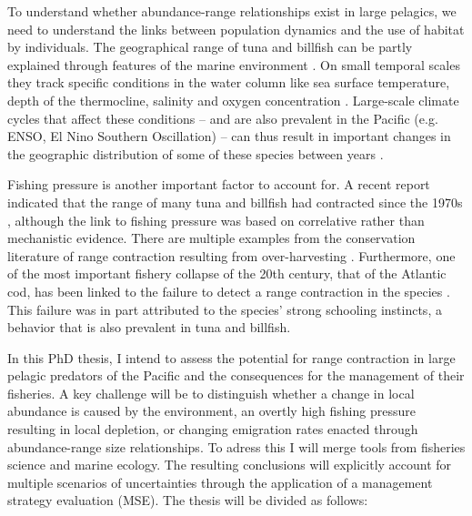 \documentclass{article}
\begin{document}
To understand whether abundance-range relationships exist in large
pelagics, we need to understand the links between population dynamics
and the use of habitat by individuals. The geographical range
of tuna and billfish can be partly explained through features of the
marine environment \citep[e.g.][]{Reygondeau2012_a}. On small temporal
scales they track specific conditions in the water column like sea surface
temperature, depth of the thermocline, salinity and oxygen
concentration \citep[e.g.][]{Fiedler1987_a, Reese2011_a}. Large-scale
climate cycles that affect these conditions -- and are also prevalent in
the Pacific (e.g. ENSO, El Nino Southern Oscillation) -- can thus result
in important changes in the geographic distribution of some of these
species between years \citep{Lehodey1997_a}.

Fishing pressure is another important factor to account for. A recent report indicated that the range of many
tuna and billfish had contracted since the 1970s \citep{Worm2011_a},
although the link to fishing pressure was based on correlative rather
than mechanistic evidence. There are multiple examples from the
conservation literature of range contraction resulting from
over-harvesting \citep[e.g.][]{Laliberte2004_a}. Furthermore, one of the most
important fishery collapse of the 20th century, that of the Atlantic cod,
has been linked to the failure to detect a range contraction in the
species \citep{Rose1999_a}. This failure was in part attributed to the
species' strong schooling instincts, a behavior that is also prevalent
in tuna and billfish.

In this PhD thesis, I intend to assess the potential for range
contraction in large pelagic predators of the Pacific and the
consequences for the management of their fisheries. A key challenge will
be to distinguish whether a change in local abundance is caused by the
environment, an overtly high
fishing pressure resulting in local depletion, or changing
emigration rates enacted through abundance-range size
relationships. To adress this I will merge tools from fisheries
science and marine ecology. The resulting conclusions
will explicitly account for multiple scenarios
of uncertainties through the application of a management strategy
evaluation (MSE). The thesis will be divided as follows:
\end{document}
